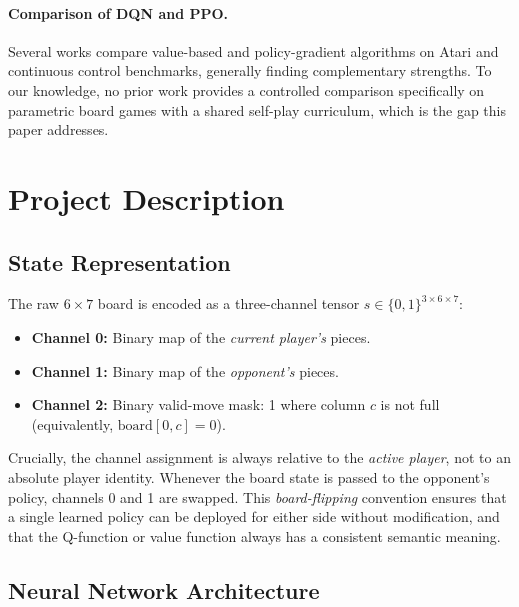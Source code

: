 \documentclass[10pt, letterpaper, twocolumn]{article}
\begin{document}
\paragraph{Comparison of DQN and PPO.}
Several works compare value-based and policy-gradient algorithms on
Atari \citep{hessel2018rainbow, mnih2016a3c} and continuous control
benchmarks, generally finding complementary strengths.  To our knowledge,
no prior work provides a controlled comparison specifically on parametric
board games with a shared self-play curriculum, which is the gap this
paper addresses.

\section{Project Description}
\label{sec:project}

\subsection{State Representation}
\label{sec:state_rep}

The raw $6{\times}7$ board is encoded as a three-channel tensor
$s \in \{0,1\}^{3 \times 6 \times 7}$:
\begin{itemize}
  \item \textbf{Channel 0:} Binary map of the \emph{current player's}
  pieces.
  \item \textbf{Channel 1:} Binary map of the \emph{opponent's} pieces.
  \item \textbf{Channel 2:} Binary valid-move mask: 1 where column $c$
  is not full (equivalently, $\text{board}[0,c] = 0$).
\end{itemize}

Crucially, the channel assignment is always relative to the \emph{active
player}, not to an absolute player identity.  Whenever the board state is
passed to the opponent's policy, channels 0 and 1 are swapped.  This
\emph{board-flipping} convention ensures that a single learned policy can
be deployed for either side without modification, and that the Q-function
or value function always has a consistent semantic meaning.

\subsection{Neural Network Architecture}
\label{sec:arch}
\end{document}
